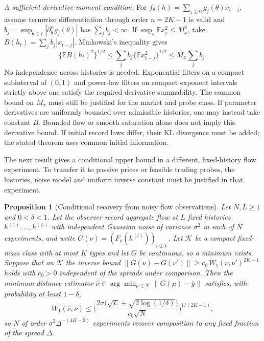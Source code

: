\documentclass[12pt]{article}
\newtheorem{proposition}[theorem]{Proposition}
\theoremstyle{definition}
\theoremstyle{remark}
\begin{document}
\noindent\emph{A sufficient derivative-moment condition.} For $f_\theta(h)=\sum_{j\ge0}g_j(\theta)x_{t-j}$, assume termwise differentiation through order $n=2K-1$ is valid and $b_j=\sup_{\theta\in I}|\partial_\theta^n g_j(\theta)|$ has $\sum_jb_j<\infty$. If $\sup_s\mathbb E x_s^2\le M_x^2$, take $B(h_t)=\sum_jb_j|x_{t-j}|$. Minkowski's inequality gives
\[
\{\mathbb E B(h_t)^2\}^{1/2}\le\sum_j b_j\{\mathbb E x_{t-j}^2\}^{1/2}\le M_x\sum_jb_j.
\]
No independence across histories is needed. Exponential filters on a compact subinterval of $(0,1)$ and power-law filters on compact exponent intervals strictly above one satisfy the required derivative summability. The common bound on $M_x$ must still be justified for the market and probe class. If parameter derivatives are uniformly bounded over admissible histories, one may instead take constant $B$. Bounded flow or smooth saturation alone does not imply this derivative bound. If initial record laws differ, their KL divergence must be added; the stated theorem uses common initial information.

The next result gives a conditional upper bound in a different, fixed-history flow experiment. To transfer it to passive prices or feasible trading probes, the histories, noise model and uniform inverse constant must be justified in that experiment.

\begin{proposition}[Conditional recovery from noisy flow observations]\label{n:univup}
Let $N,L\ge1$ and $0<\delta<1$. Let the observer record aggregate flow at $L$ fixed histories $h^{(1)},\ldots,h^{(L)}$ with independent Gaussian noise of variance $\sigma^2$ in each of $N$ experiments, and write $G(\nu)=(F_\nu(h^{(l)}))_{l\le L}$. Let $\mathcal K$ be a compact fixed-mass class with at most $K$ types and let $G$ be continuous, so a minimum exists. Suppose that on $\mathcal K$ the inverse bound $\|G(\nu)-G(\nu')\|\ge c_0\,W_1(\nu,\nu')^{2K-1}$ holds with $c_0>0$ independent of the spreads under comparison. Then the minimum-distance estimator $\hat\nu\in\arg\min_{\mu\in\mathcal K}\|G(\mu)-\bar y\|$ satisfies, with probability at least $1-\delta$,
\[
W_1(\hat\nu,\nu)\le\Big(\frac{2\sigma\big(\sqrt L+\sqrt{2\log(1/\delta)}\big)}{c_0\sqrt N}\Big)^{1/(2K-1)},
\]
so $N$ of order $\sigma^2\Delta^{-(4K-2)}$ experiments recover composition to any fixed fraction of the spread $\Delta$.
\end{proposition}
\end{document}
